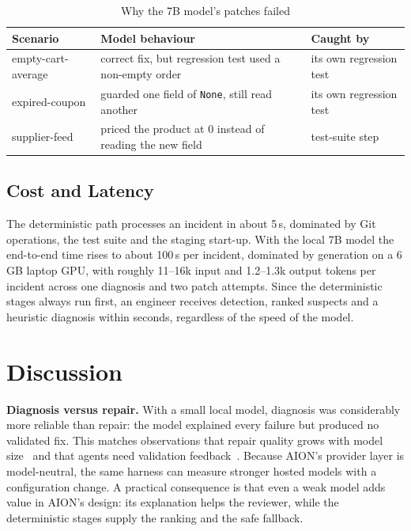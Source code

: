 \documentclass[conference]{IEEEtran}
\begin{document}
\begin{table}[t]
\centering
\caption{Why the 7B model's patches failed}
\label{tab:fail}
\footnotesize
\begin{tabular}{@{}p{1.9cm}p{3.9cm}p{2.0cm}@{}}
\toprule
Scenario & Model behaviour & Caught by \\
\midrule
empty-cart-average & correct fix, but regression test used a non-empty order & its own regression test \\
expired-coupon & guarded one field of \texttt{None}, still read another & its own regression test \\
supplier-feed & priced the product at 0 instead of reading the new field & test-suite step \\
\bottomrule
\end{tabular}
\end{table}

\subsection{Cost and Latency}
The deterministic path processes an incident in about 5\,s, dominated by Git operations, the test suite and the staging start-up. With the local 7B model the end-to-end time rises to about 100\,s per incident, dominated by generation on a 6\,GB laptop GPU, with roughly 11--16k input and 1.2--1.3k output tokens per incident across one diagnosis and two patch attempts. Since the deterministic stages always run first, an engineer receives detection, ranked suspects and a heuristic diagnosis within seconds, regardless of the speed of the model.

\section{Discussion}
\label{sec:disc}
\textbf{Diagnosis versus repair.} With a small local model, diagnosis was considerably more reliable than repair: the model explained every failure but produced no validated fix. This matches observations that repair quality grows with model size~\cite{xia2023apr} and that agents need validation feedback~\cite{kulsum2024vrpilot,bouzenia2025repairagent}. Because AION's provider layer is model-neutral, the same harness can measure stronger hosted models with a configuration change. A practical consequence is that even a weak model adds value in AION's design: its explanation helps the reviewer, while the deterministic stages supply the ranking and the safe fallback.
\end{document}
